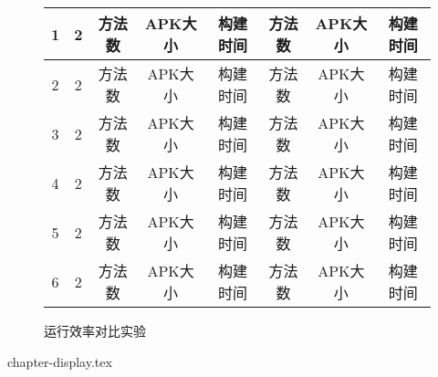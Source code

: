 {\begin{figure*}[!ht]
{\begin{threeparttable}[b]
\begin{tabular}{|c|c|c|c|c|c|c|c|}
				1&	2   &方法数 & APK大小 &	构建时间 & 方法数 & APK大小 & 构建时间\\
				\hline
				2&	2   &方法数 & APK大小 &	构建时间 & 方法数 & APK大小 & 构建时间\\
				\hline
				3&	2    &方法数 & APK大小 &	构建时间 & 方法数 & APK大小 & 构建时间\\
				\hline
				4&	2    &方法数 & APK大小 &	构建时间 & 方法数 & APK大小 & 构建时间\\
				\hline
				5&	2    &方法数 & APK大小 &	构建时间 & 方法数 & APK大小 & 构建时间\\
				\hline		
				6&	2    &方法数 & APK大小 &	构建时间 & 方法数 & APK大小 & 构建时间\\
				\hline			
	
				
				
				
			\end{tabular}
			
			
		\end{threeparttable}
	}
	
	
	\caption{运行效率对比实验}
	
	\label{tbl:hookResult}
\end{figure*}
}
 {chapter-display.tex}